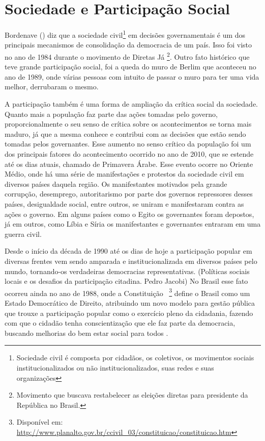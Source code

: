 \chapter{Sociedade e Participação Social}
\label{cap:sociedadepsocial}

Bordenave (\citeyear{bordenave1983participacao}) diz que a sociedade civil\footnote{Sociedade civil é composta por cidadãos, os coletivos, os movimentos sociais institucionalizados ou não institucionalizados, suas redes e suas organizações} em decisões governamentais é um dos principais mecanismos de consolidação da democracia de um país. Isso foi visto no ano de 1984 durante o movimento de Diretas Já \footnote{Movimento que buscava restabelecer as eleições diretas para presidente da República no Brasil.}. Outro fato histórico que teve grande participação social, foi a queda do muro de Berlim que aconteceu no ano de 1989, onde várias pessoas com intuito de passar o muro para ter uma vida melhor, derrubaram o mesmo. 

A participação também é uma forma de ampliação da crítica social da sociedade. Quanto mais a população faz parte das ações tomadas pelo governo, proporcionalmente o seu senso de crítica sobre os acontecimentos se torna mais maduro, já que a mesma conhece e contribui com as decisões que estão sendo tomadas pelos governantes. Esse aumento no senso crítico da população foi um dos principais fatores do acontecimento ocorrido no ano de 2010, que se estende até os dias atuais, chamado de Primavera Árabe. Esse evento ocorre no Oriente Médio, onde há uma série de manifestações e protestos da sociedade civil em diversos países daquela região. Os manifestantes motivados pela grande corrupção, desemprego, autoritarismo por parte dos governos repressores desses países, desigualdade social, entre outros, se uniram e manifestaram contra as ações o governo. Em alguns países como o Egito os governantes foram depostos, já em outros, como Líbia e Síria os manifestantes e governantes entraram em uma guerra civil.  

Desde o início da década de 1990 até os dias de hoje a participação popular em diversas frentes vem sendo amparada e institucionalizada em diversos países pelo mundo, tornando-os verdadeiras democracias representativas. (Políticas sociais locais e os desafios da participação citadina. Pedro Jacobi) No Brasil esse fato ocorreu ainda no ano de 1988, onde a Constituição \citeyear{cf}~\footnote{Disponível em: \url{http://www.planalto.gov.br/ccivil_03/constituicao/constituicao.htm}} define o Brasil como um Estado Democrático de Direito, atribuindo um novo modelo para gestão pública que trouxe a participação popular como o exercício pleno da cidadania, fazendo com que o cidadão tenha conscientização que ele faz parte da democracia, buscando melhorias do bem estar social para todos \cite{scuassante2009constituicao}. 


